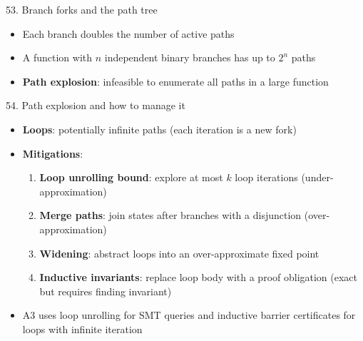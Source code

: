 \documentclass[aspectratio=169]{beamer}
\begin{document}
\begin{frame}{53. Branch forks and the path tree}
\begin{center}
\end{center}
\begin{itemize}
  \item Each branch doubles the number of active paths
  \item A function with \(n\) independent binary branches has up to \(2^n\) paths
  \item \textbf{Path explosion}: infeasible to enumerate all paths in a large function
\end{itemize}
\end{frame}

\begin{frame}{54. Path explosion and how to manage it}
\begin{itemize}
  \item \textbf{Loops}: potentially infinite paths (each iteration is a new fork)
  \item \textbf{Mitigations}:
    \begin{enumerate}
      \item \textbf{Loop unrolling bound}: explore at most \(k\) loop iterations (under-approximation)
      \item \textbf{Merge paths}: join states after branches with a disjunction (over-approximation)
      \item \textbf{Widening}: abstract loops into an over-approximate fixed point
      \item \textbf{Inductive invariants}: replace loop body with a proof obligation (exact but requires finding invariant)
    \end{enumerate}
  \item A3 uses loop unrolling for SMT queries and inductive barrier certificates for loops with
    infinite iteration
\end{itemize}
\end{frame}
\end{document}
